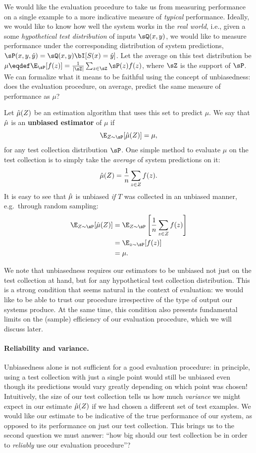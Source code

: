 We would like the evaluation procedure to take us from measuring performance on a single example to a more indicative measure of \textit{typical} performance.
Ideally, we would like to know how well the system works in the \textit{real world}, i.e., given a some \textit{hypothetical test distribution} of inputs $\sQ(x,y)$, we would like to measure performance under the corresponding distribution of system predictions, $\sP(x, y, \yh) = \sQ(x, y) \bI[S(x) = \yh]$.
Let the average on this test distribution be $\mu \eqdef \E_{\sP}[f(z)] = \frac{1}{|\sZ|} \sum_{z \in \sZ} \sP(z) f(z)$, where $\sZ$ is the support of $\sP$.
We can formalize what it means to be faithful using the concept of unbiasedness: does the evaluation procedure, on average, predict the same measure of performance as $\mu$?

Let $\hat{\mu}(Z)$ be an estimation algorithm that uses this set to predict $\mu$.
We say that $\hat{\mu}$ is an \textbf{unbiased estimator} of $\mu$ if
\[
\E_{Z\sim \sP}[\muh(Z)] = \mu,
\]
for any test collection distribution $\sP$. 
One simple method to evaluate $\mu$ on the test collection is to simply take the \textit{average} of system predictions on it:
\[
\hat{\mu}(Z) = \frac{1}{n} \sum_{z \in Z} f(z).
\]
It is easy to see that $\hat{\mu}$ is unbiased \textit{if} $T$ was collected in an unbiased manner, e.g.\ through random sampling:
\begin{align*}
  \E_{Z \sim \sP}[\muh(Z)] 
    &= \E_{Z \sim \sP}\left[\frac{1}{n} \sum_{z \in Z} f(z) \right] \\
    &= \E_{z \sim \sP}[f(z)] \\
    &= \mu.
\end{align*}

We note that unbiasedness requires our estimators to be unbiased not just on the test collection at hand, but for any hypothetical test collection distribution.
This is a strong condition that seems natural in the context of evaluation: we would like to be able to trust our procedure irrespective of the type of output our systems produce.
At the same time, this condition also presents fundamental limits on the (sample) efficiency of our evaluation procedure, which we will discuss later.

\paragraph{Reliability and variance.}
Unbiasedness alone is not sufficient for a good evaluation procedure: in principle, using a test collection with just a single point would still be unbiased even though its predictions would vary greatly depending on which point was chosen!
Intuitively, the size of our test collection tells us how much \textit{variance} we might expect in our estimate $\hat{\mu}(Z)$ if we had chosen a different set of test examples.  
We would like our estimate to be indicative of the true performance of our system, as opposed to its performance on just our test collection.
This brings us to the second question we must answer: ``how big should our test collection be in order to \textit{reliably} use our evaluation procedure''?

